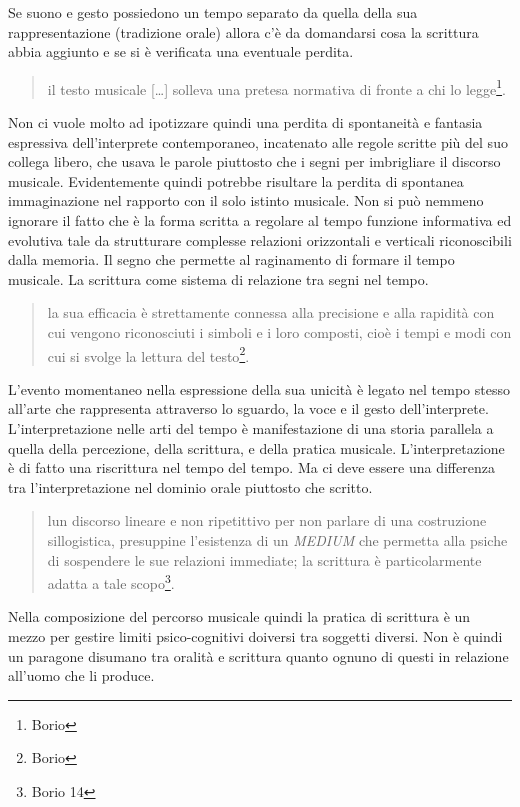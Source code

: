 \begin{multicols}{2}
Se suono e gesto possiedono un tempo separato da quella della sua rappresentazione (tradizione orale) allora c'è da domandarsi cosa la scrittura abbia aggiunto e se si è verificata una eventuale perdita.

\begin{quote}
	il testo musicale [\ldots] solleva una pretesa normativa di fronte a chi lo legge\footnote{Borio}.
\end{quote}

Non ci vuole molto ad ipotizzare quindi una perdita di spontaneità e fantasia espressiva dell'interprete contemporaneo, incatenato alle regole scritte più del suo collega libero, che usava le parole piuttosto che i segni per imbrigliare il discorso musicale. Evidentemente quindi potrebbe risultare la perdita di spontanea immaginazione nel rapporto con il solo istinto musicale. Non si può nemmeno ignorare il fatto che è la forma scritta a regolare al tempo funzione informativa ed evolutiva tale da strutturare complesse relazioni orizzontali e verticali riconoscibili dalla memoria. Il segno che permette al raginamento di formare il tempo musicale. La scrittura come sistema di relazione tra segni nel tempo.

\begin{quote}
	la sua efficacia è strettamente connessa alla precisione e alla rapidità con cui vengono riconosciuti i simboli e i loro composti, cioè i tempi e modi con cui si svolge la lettura del testo\footnote{Borio}.
\end{quote}

L'evento momentaneo nella espressione della sua unicità è legato nel tempo stesso all'arte che rappresenta attraverso lo sguardo, la voce e il gesto dell'interprete. L'interpretazione nelle arti del tempo è manifestazione di una storia parallela a quella della percezione, della scrittura, e della pratica musicale. L'interpretazione è di fatto una riscrittura nel tempo del tempo. Ma ci deve essere una differenza tra l'interpretazione nel dominio orale piuttosto che scritto.

\begin{quote}
	lun discorso lineare e non ripetittivo per non parlare di una costruzione sillogistica, presuppine l'esistenza di un \emph{MEDIUM} che permetta alla psiche di sospendere le sue relazioni immediate; la scrittura è particolarmente adatta a tale scopo\footnote{Borio 14}.
\end{quote}

Nella composizione del percorso musicale quindi la pratica di scrittura è un mezzo per gestire limiti psico-cognitivi doiversi tra soggetti diversi. Non è quindi un paragone disumano tra oralità e scrittura quanto ognuno di questi in relazione all'uomo che li produce.


\end{multicols}
